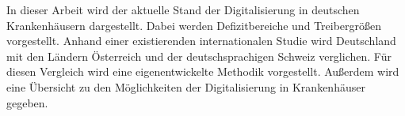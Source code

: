 
In dieser Arbeit wird der aktuelle Stand der Digitalisierung in deutschen Krankenhäusern dargestellt. Dabei werden Defizitbereiche und Treibergrößen vorgestellt. Anhand einer existierenden internationalen Studie wird Deutschland mit den Ländern Österreich und der deutschsprachigen Schweiz verglichen. Für diesen Vergleich wird eine eigenentwickelte Methodik vorgestellt. Außerdem wird eine Übersicht zu den Möglichkeiten der Digitalisierung in Krankenhäuser gegeben.
